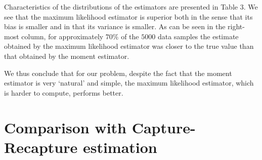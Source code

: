 \documentclass[a4paper,10pt,twoside]{article}
\begin{document}
Characteristics of the distributions of the estimators are presented in Table 3. 
We see that the maximum likelihood estimator is superior both in the sense that its bias is smaller and in that
its variance is smaller. As can be seen in the right-most column, for approximately $70\%$ of the $5000$ data samples
the estimate obtained by the maximum likelihood estimator was closer to the true value than that obtained by the
moment estimator.

We thus conclude that for our problem, despite the fact that the moment estimator is very `natural' and 
simple, the maximum likelihood estimator, which is harder to compute, performs better.

\section{Comparison with Capture-Recapture estimation}
\label{comparison}
\end{document}
